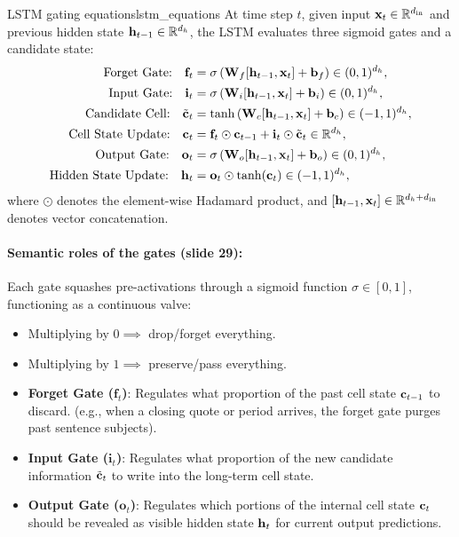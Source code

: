 \documentclass[../../main.tex]{subfiles}
\begin{document}
\begin{definition}{LSTM gating equations}{lstm_equations}
At time step $t$, given input $\mathbf{x}_t \in \mathbb{R}^{d_{\text{in}}}$ and previous hidden state $\mathbf{h}_{t-1} \in \mathbb{R}^{d_h}$, the LSTM evaluates three sigmoid gates and a candidate state:
\begin{align}
\text{Forget Gate:} \quad \mathbf{f}_t &= \sigma\left( \mathbf{W}_f [\mathbf{h}_{t-1}, \mathbf{x}_t] + \mathbf{b}_f \right) \in (0, 1)^{d_h}, \label{eq:lstm_forget} \\
\text{Input Gate:} \quad \mathbf{i}_t &= \sigma\left( \mathbf{W}_i [\mathbf{h}_{t-1}, \mathbf{x}_t] + \mathbf{b}_i \right) \in (0, 1)^{d_h}, \label{eq:lstm_input} \\
\text{Candidate Cell:} \quad \tilde{\mathbf{c}}_t &= \tanh\left( \mathbf{W}_c [\mathbf{h}_{t-1}, \mathbf{x}_t] + \mathbf{b}_c \right) \in (-1, 1)^{d_h}, \label{eq:lstm_candidate} \\
\text{Cell State Update:} \quad \mathbf{c}_t &= \mathbf{f}_t \odot \mathbf{c}_{t-1} + \mathbf{i}_t \odot \tilde{\mathbf{c}}_t \in \mathbb{R}^{d_h}, \label{eq:lstm_highway} \\
\text{Output Gate:} \quad \mathbf{o}_t &= \sigma\left( \mathbf{W}_o [\mathbf{h}_{t-1}, \mathbf{x}_t] + \mathbf{b}_o \right) \in (0, 1)^{d_h}, \label{eq:lstm_output} \\
\text{Hidden State Update:} \quad \mathbf{h}_t &= \mathbf{o}_t \odot \tanh(\mathbf{c}_t) \in (-1, 1)^{d_h}, \label{eq:lstm_hidden}
\end{align}
where $\odot$ denotes the element-wise Hadamard product, and $[\mathbf{h}_{t-1}, \mathbf{x}_t] \in \mathbb{R}^{d_h + d_{\text{in}}}$ denotes vector concatenation.
\end{definition}

\paragraph{Semantic roles of the gates (slide 29):}
Each gate squashes pre-activations through a sigmoid function $\sigma \in [0, 1]$, functioning as a continuous valve:
\begin{itemize}
    \item Multiplying by $0 \implies$ drop/forget everything.
    \item Multiplying by $1 \implies$ preserve/pass everything.
\end{itemize}
\begin{itemize}
    \item \textbf{Forget Gate ($\mathbf{f}_t$)}: Regulates what proportion of the past cell state $\mathbf{c}_{t-1}$ to discard. (e.g., when a closing quote or period arrives, the forget gate purges past sentence subjects).
    \item \textbf{Input Gate ($\mathbf{i}_t$)}: Regulates what proportion of the new candidate information $\tilde{\mathbf{c}}_t$ to write into the long-term cell state.
    \item \textbf{Output Gate ($\mathbf{o}_t$)}: Regulates which portions of the internal cell state $\mathbf{c}_t$ should be revealed as visible hidden state $\mathbf{h}_t$ for current output predictions.
\end{itemize}
\end{document}
